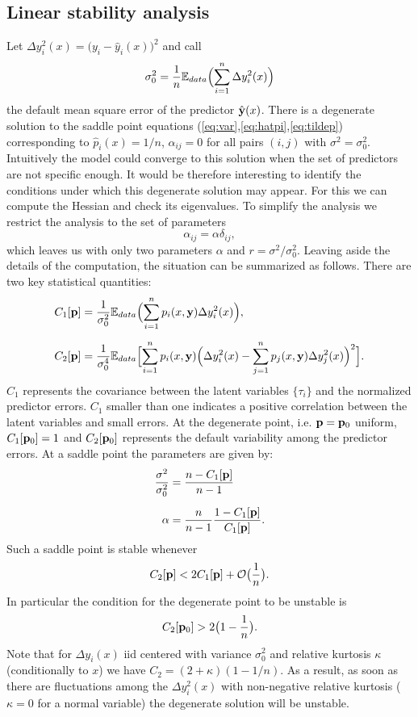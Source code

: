 \documentclass[envcountsect,runningheads]{llncs}
\theoremstyle{etoile}
\begin{document}
\subsection{Linear stability analysis}\label{sec:stability}
Let $\Delta y_i^2(x)= \bigl(y_i-\hat y_i(x)\bigr)^2$ and call
\[
\sigma_0^2 = \frac{1}{n}{\mathbb E}_{data}\Bigl(\sum_{i=1}^n \Delta y_i^2(x)\Bigr)
\]
the default mean square error of the predictor ${\hat {\bf y}}(x)$.
There is a degenerate solution to the saddle point equations (\ref{eq:var},\ref{eq:hatpi},\ref{eq:tildep}) corresponding to $\hat p_i(x) = 1/n$, $\alpha_{ij}=0$ for all
pairs $(i,j)$ with $\sigma^2=\sigma_0^2$. Intuitively the model could converge to this solution when the set of predictors are not specific enough.
It would be therefore interesting to identify the conditions under which this degenerate solution may appear. For this we can compute the Hessian and check its eigenvalues.
To simplify the analysis
we restrict the analysis to the set of parameters
\[
\alpha_{ij} = \alpha \delta_{ij},
\]
which leaves us with only two parameters $\alpha$ and $r = \sigma^2/\sigma_0^2$. Leaving aside the details of the computation, %
the situation can be summarized as follows. There are two key statistical quantities:
\begin{align}
C_1[{\bf p}] &= \frac{1}{\sigma_0^2}{\mathbb E}_{data}\Bigl(\sum_{i=1}^n p_i(x,{\bf y})\Delta y_i^2(x)\Bigr),\label{def:C1}\\[0.2cm]
C_2[{\bf p}] &= \frac{1}{\sigma_0^4}{\mathbb E}_{data}\Bigl[\sum_{i=1}^n p_i(x,{\bf y})\Bigl(\Delta y_i^2(x)-\sum_{j=1}^np_j(x,{\bf y})\Delta y_j^2(x)\Bigr)^2\Bigr].\label{def:C2}
\end{align}
$C_1$ represents the covariance between the latent variables $\{\tau_i\}$ and the normalized predictor errors. $C_1$ smaller than one 
indicates a positive correlation between the latent variables and small errors. At the degenerate point, i.e. ${\bf p}={\bf p}_{0}$ uniform, $C_1[{\bf p}_{0}]=1$ and $C_2[{\bf p}_{0}]$
represents the default variability among the predictor errors.
At a saddle point the parameters are given by:
\begin{align*}
\frac{\sigma^2}{\sigma_0^2} &= \frac{n-C_1[{\bf p}]}{n-1} \\[0.2cm]
\alpha &= \frac{n}{n-1}\frac{1-C_1[{\bf p}]}{C_1[{\bf p}]}.
\end{align*}
Such a saddle point is stable whenever
\[
C_2[{\bf p}] < 2C_1[{\bf p}]+{\cal O}\bigl(\frac{1}{n}\bigr).
\]
In particular the condition for the degenerate point to be unstable is
\[
C_2[{\bf p}_0] > 2\bigl(1-\frac{1}{n}\bigr).
\]
Note that for $\Delta y_i(x)$ iid centered with variance $\sigma_0^2$ and relative kurtosis $\kappa$ (conditionally to $x$)
we have $C_2 = (2+\kappa)(1-1/n)$. As a result, as soon as there are fluctuations among the $\Delta y_i^2(x)$ with non-negative relative kurtosis ($\kappa=0$ for a normal variable)
the  degenerate solution will be unstable.
\end{document}
